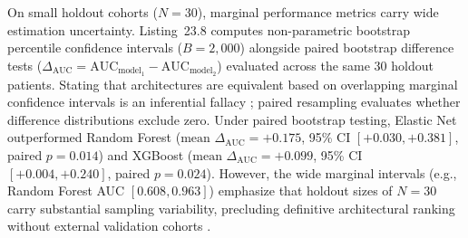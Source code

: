 \documentclass[11pt,oneside]{book}
\begin{document}
On small holdout cohorts ($N = 30$), marginal performance metrics carry wide estimation uncertainty. Listing~23.8 computes non-parametric bootstrap percentile confidence intervals ($B = 2{,}000$) alongside paired bootstrap difference tests ($\Delta_{\text{AUC}} = \text{AUC}_{\text{model}_1} - \text{AUC}_{\text{model}_2}$) evaluated across the same 30 holdout patients. Stating that architectures are equivalent based on overlapping marginal confidence intervals is an inferential fallacy \cite{schenker2001judging}; paired resampling evaluates whether difference distributions exclude zero. Under paired bootstrap testing, Elastic Net outperformed Random Forest ($\text{mean } \Delta_{\text{AUC}} = +0.175$, 95\% CI $[+0.030, +0.381]$, paired $p = 0.014$) and XGBoost ($\text{mean } \Delta_{\text{AUC}} = +0.099$, 95\% CI $[+0.004, +0.240]$, paired $p = 0.024$). However, the wide marginal intervals (e.g., Random Forest AUC $[0.608, 0.963]$) emphasize that holdout sizes of $N = 30$ carry substantial sampling variability, precluding definitive architectural ranking without external validation cohorts \cite{delong1988comparing}.
\end{document}
